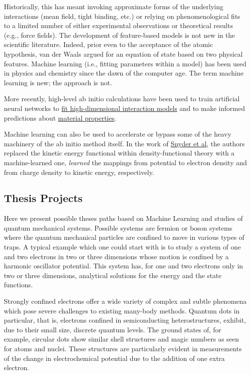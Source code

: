 \documentclass[%
oneside,                 %
final,                   %
10pt]{article}
\begin{document}
Historically, this has meant invoking
approximate forms of the underlying interactions (mean field, tight
binding, etc.) or relying on phenomenological fits to a limited number
of either experimental observations or theoretical results (e.g., force fields). 
The development of feature-based models is not
new in the scientific literature. Indeed, prior even to the acceptance
of the atomic hypothesis, van der Waals argued for an equation of
state based on two physical features. Machine learning (i.e.,
fitting parameters within a model) has been used in physics and
chemistry since the dawn of the computer age. The term machine
learning is new; the approach is not.

More recently, high-level ab initio calculations have been used to
train artificial neural networks to \href{{http://www.sciencedirect.com/science/article/pii/S0927025615007806?via%
models}  and to make informed predictions about \href{{https://www.nature.com/articles/srep40827}}{material properties}. 

Machine learning can also be used to accelerate or bypass some of the
heavy machinery of the ab initio method itself. In the work of \href{{https://journals.aps.org/prl/abstract/10.1103/PhysRevLett.108.253002}}{Snyder et al},  the authors
replaced the kinetic energy functional within density-functional
theory with a machine-learned one, 
\emph{learned} the mappings from potential to electron density and from
charge density to kinetic energy, respectively.

\subsection*{Thesis Projects}

Here we present possible theses paths based on Machine Learning and
studies of quantum mechanical systems.  Possible systems are fermion
or boson systems where the quantum mechanical particles are confined
to move in various types of traps. A typical example which one could
start with is to study a system of one and two electrons in two or three
dimensions whose motion is confined by a harmonic  oscillator potential. This
system has, for one and two electrons only in two or three dimensions,
analytical solutions for the energy and the state
functions. 


Strongly confined electrons offer a wide variety of complex and subtle
phenomena which pose severe challenges to existing many-body methods.
Quantum dots in particular, that is, electrons confined in
semiconducting heterostructures, exhibit, due to their small size,
discrete quantum levels.  The ground states of, for example, circular
dots show similar shell structures and magic numbers as seen for atoms
and nuclei. These structures are particularly evident in measurements
of the change in electrochemical potential due to the addition of one
extra electron.
\end{document}
